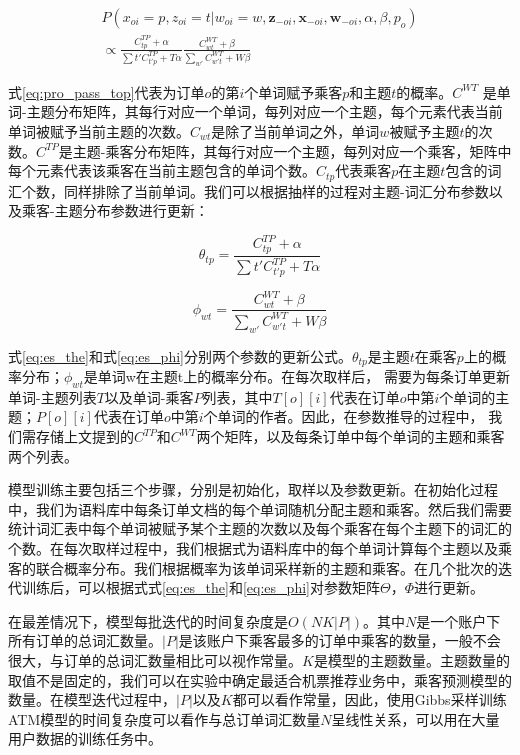 \begin{eqnarray}
\label{eq:pro_pass_top}
P(x_{oi}=p,z_{oi}=t|w_{oi}=w,\mathbf{z}_{-oi},\mathbf{x}_{-oi},\mathbf{w}_{-oi},\alpha,\beta,p_o) \nonumber\\
\propto \frac{C_{tp}^{TP}+\alpha}{\sum{t'}C_{t'p}^{TP}+T\alpha}\frac{C_{wt}^{WT}+\beta}{\sum_{w'}C_{w't}^{WT}+W\beta}
\end{eqnarray}

式\ref{eq:pro_pass_top}代表为订单$o$的第$i$个单词赋予乘客$p$和主题$t$的概率。$C^{WT}$ 是单词-主题分布矩阵，其每行对应一个单词，每列对应一个主题，每个元素代表当前单词被赋予当前主题的次数。$C_{wt}$是除了当前单词之外，单词$w$被赋予主题$t$的次数。$C^{TP}$是主题-乘客分布矩阵，其每行对应一个主题，每列对应一个乘客，矩阵中每个元素代表该乘客在当前主题包含的单词个数。$C_{tp}$代表乘客$p$在主题$t$包含的词汇个数，同样排除了当前单词。我们可以根据抽样的过程对主题-词汇分布参数以及乘客-主题分布参数进行更新：

\begin{equation}
\label{eq:es_the}
\theta_{tp} = \frac{C_{tp}^{TP}+\alpha}{\sum{t'}C_{t'p}^{TP}+T\alpha}
\end{equation}

\begin{equation}
\label{eq:es_phi}
\phi_{wt} = \frac{C_{wt}^{WT}+\beta}{\sum_{w'}C_{w't}^{WT}+W\beta}
\end{equation}

式\ref{eq:es_the}和式\ref{eq:es_phi}分别两个参数的更新公式。$\theta_{tp}$是主题$t$在乘客$p$上的概率分布；$\phi_{wt}$是单词w在主题t上的概率分布。在每次取样后，
需要为每条订单更新单词-主题列表$T$以及单词-乘客$P$列表，其中$T[o][i]$代表在订单$o$中第$i$个单词的主题；$P[o][i]$代表在订单$o$中第$i$个单词的作者。因此，在参数推导的过程中，
我们需存储上文提到的$C^{TP}$和$C^{WT}$两个矩阵，以及每条订单中每个单词的主题和乘客两个列表。


模型训练主要包括三个步骤，分别是初始化，取样以及参数更新。在初始化过程中，我们为语料库中每条订单文档的每个单词随机分配主题和乘客。然后我们需要统计词汇表中每个单词被赋予某个主题的次数以及每个乘客在每个主题下的词汇的个数。在每次取样过程中，我们根据式\label{eq:p_xz}为语料库中的每个单词计算每个主题以及乘客的联合概率分布。我们根据概率为该单词采样新的主题和乘客。在几个批次的迭代训练后，可以根据式式\ref{eq:es_the}和\ref{eq:es_phi}对参数矩阵$\Theta$，$\Phi$进行更新。

在最差情况下，模型每批迭代的时间复杂度是$O(NK|P|)$。其中$N$是一个账户下所有订单的总词汇数量。$|P|$是该账户下乘客最多的订单中乘客的数量，一般不会很大，与订单的总词汇数量相比可以视作常量。$K$是模型的主题数量。主题数量的取值不是固定的，我们可以在实验中确定最适合机票推荐业务中，乘客预测模型的数量。在模型迭代过程中，$|P|$以及$K$都可以看作常量，因此，使用Gibbs采样训练ATM模型的时间复杂度可以看作与总订单词汇数量$N$呈线性关系，可以用在大量用户数据的训练任务中。


